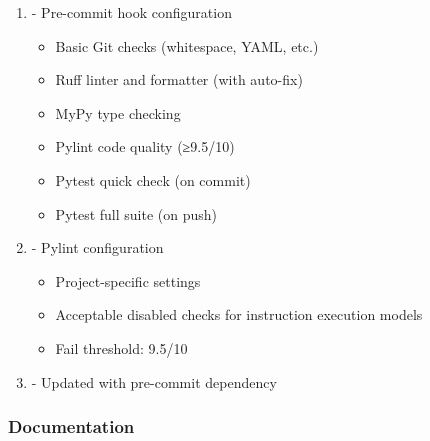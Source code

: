 \begin{record}

\begin{enumerate}
\def\labelenumi{\arabic{enumi}.}
\item
  \textbf{} - Pre-commit hook configuration

  \begin{itemize}
  \tightlist
  \item
    Basic Git checks (whitespace, YAML, etc.)
  \item
    Ruff linter and formatter (with auto-fix)
  \item
    MyPy type checking
  \item
    Pylint code quality (≥9.5/\allowbreak{}10)
  \item
    Pytest quick check (on commit)
  \item
    Pytest full suite (on push)
  \end{itemize}
\item
  \textbf{} - Pylint configuration

  \begin{itemize}
  \tightlist
  \item
    Project-specific settings
  \item
    Acceptable disabled checks for instruction execution models
  \item
    Fail threshold: 9.5/10
  \end{itemize}
\item
  \textbf{} - Updated with pre-commit dependency
\end{enumerate}

\end{record}

\subsubsection{Documentation}\label{cr:app:archive-pre-commit-setup-summary:documentation}


